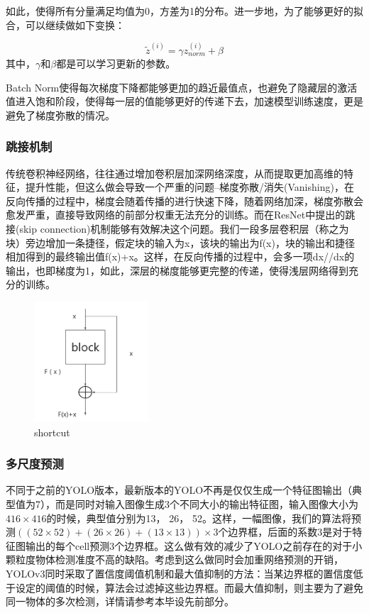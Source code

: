 \documentclass[12pt,a4paper,titlepage]{article}
\begin{document}
如此，使得所有分量满足均值为0，方差为1的分布。进一步地，为了能够更好的拟合，可以继续做如下变换：

\begin{equation}
\widetilde{z}^{(i)} = \gamma z_{norm}^{(i)}+\beta
\end{equation}
其中，$\gamma$和$\beta$都是可以学习更新的参数。\par
Batch Norm使得每次梯度下降都能够更加的趋近最值点，也避免了隐藏层的激活值进入饱和阶段，使得每一层的值能够更好的传递下去，加速模型训练速度，更是避免了梯度弥散的情况。

\subsubsection{跳接机制}
传统卷积神经网络，往往通过增加卷积层加深网络深度，从而提取更加高维的特征，提升性能，但这么做会导致一个严重的问题--梯度弥散/消失(Vanishing)，在反向传播的过程中，梯度会随着传播的进行快速下降，随着网络加深，梯度弥散会愈发严重，直接导致网络的前部分权重无法充分的训练。而在ResNet中提出的跳接(skip connection)机制能够有效解决这个问题。我们一段多层卷积层（称之为块）旁边增加一条捷径，假定块的输入为x，该块的输出为f(x)，块的输出和捷径相加得到的最终输出值f(x)+x。这样，在反向传播的过程中，会多一项dx//dx的输出，也即梯度为1，如此，深层的梯度能够更完整的传递，使得浅层网络得到充分的训练。

\begin{figure}[h]
\centering
\includegraphics[height=4.5cm]{img/shortcut.png}
\caption{shortcut}
\label{fig:shortcut}
\end{figure}

\subsubsection{多尺度预测}
不同于之前的YOLO版本，最新版本的YOLO不再是仅仅生成一个特征图输出（典型值为7），而是同时对输入图像生成3个不同大小的输出特征图，输入图像大小为$416\times 416$的时候，典型值分别为13， 26， 52。这样，一幅图像，我们的算法将预测$((52\times 52)+(26\times 26)+(13\times 13))\times 3$个边界框，后面的系数3是对于特征图输出的每个cell预测3个边界框。这么做有效的减少了YOLO之前存在的对于小颗粒度物体检测准度不高的缺陷。考虑到这么做同时会加重网络预测的开销，YOLOv3同时采取了置信度阈值机制和最大值抑制的方法：当某边界框的置信度低于设定的阈值的时候，算法会过滤掉这些边界框。而最大值抑制，则主要为了避免同一物体的多次检测，详情请参考本毕设先前部分。
\end{document}
